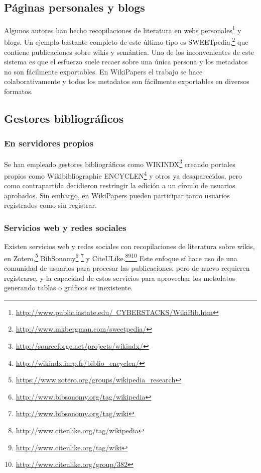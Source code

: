 \documentclass[11pt,onecolumn]{article}
\begin{document}
\subsection{Páginas personales y blogs}
Algunos autores han hecho recopilaciones de literatura en webs personales\footnote{\href{http://www.public.iastate.edu/~CYBERSTACKS/WikiBib.htm}{http://www.public.iastate.edu/~CYBERSTACKS/WikiBib.htm}} y blogs. Un ejemplo bastante completo de este último tipo es SWEETpedia,\footnote{\href{http://www.mkbergman.com/sweetpedia/}{http://www.mkbergman.com/sweetpedia/}} que contiene publicaciones sobre wikis y semántica. Uno de los inconvenientes de este sistema es que el esfuerzo suele recaer sobre una única persona y los metadatos no son fácilmente exportables. En WikiPapers el trabajo se hace colaborativamente y todos los metadatos son fácilmente exportables en diversos formatos.

\subsection{Gestores bibliográficos}

\subsubsection{En servidores propios}
Se han empleado gestores bibliográficos como WIKINDX\footnote{\href{http://sourceforge.net/projects/wikindx/}{http://sourceforge.net/projects/wikindx/}} creando portales propios como Wikibibliographie ENCYCLEN\footnote{\href{http://wikindx.inrp.fr/biblio_encyclen/}{http://wikindx.inrp.fr/biblio\_encyclen/}} y otros ya desaparecidos, pero como contrapartida decidieron restringir la edición a un círculo de usuarios aprobados. Sin embargo, en WikiPapers pueden participar tanto usuarios registrados como sin registrar.


\subsubsection{Servicios web y redes sociales}
Existen servicios web y redes sociales con recopilaciones de literatura sobre wikis, en Zotero,\footnote{\href{https://www.zotero.org/groups/wikipedia_research}{https://www.zotero.org/groups/wikipedia\_research}} BibSonomy\footnote{\href{http://www.bibsonomy.org/tag/wikipedia}{http://www.bibsonomy.org/tag/wikipedia}} \footnote{\href{http://www.bibsonomy.org/tag/wiki}{http://www.bibsonomy.org/tag/wiki}} y CiteULike.\footnote{\href{http://www.citeulike.org/tag/wikipedia}{http://www.citeulike.org/tag/wikipedia}}\footnote{\href{http://www.citeulike.org/tag/wiki}{http://www.citeulike.org/tag/wiki}}\footnote{\href{http://www.citeulike.org/group/382}{http://www.citeulike.org/group/382}} Este enfoque sí hace uso de una comunidad de usuarios para procesar las publicaciones, pero de nuevo requieren registrarse, y la capacidad de estos servicios para aprovechar los metadatos generando tablas o gráficos es inexistente.
\end{document}
